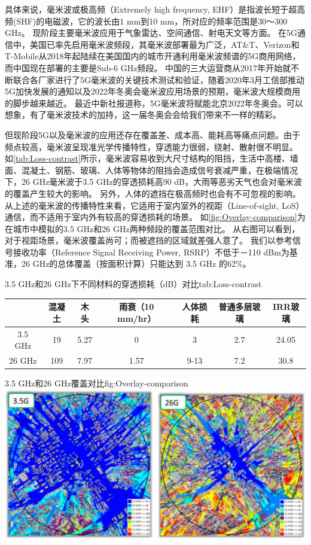 \documentclass[supercite]{HustGraduPaper}
\begin{document}
具体来说，毫米波或极高频（Extremely high frequency, EHF）是指波长短于超高频(SHF)的电磁波，它的波长由1 mm到10 mm，所对应的频率范围是30～300 GHz\cite{enwiki:1021979549}。
现阶段主要毫米波应用于气象雷达、空间通信、射电天文等方面。
在5G通信中，美国已率先启用毫米波频段，其毫米波部署最为广泛，AT\&T、Verizon和T-Mobile从2018年起陆续在美国国内的城市开通利用毫米波频谱的5G商用网络，而中国现在部署的主要是Sub-6 GHz频段\cite{ZTE2020}。
中国的三大运营商从2017年开始就不断联合各厂家进行了5G毫米波的关键技术测试和验证，随着2020年3月工信部推动5G加快发展的通知以及2022年冬奥会毫米波应用场景的预期，毫米波大规模商用的脚步越来越近\cite{ZTE2020}。
最近中新社报道称，5G毫米波将赋能北京2022年冬奥会。可以想象，有了毫米波技术的加持，这一届冬奥会会给我们带来不一样的精彩。

但现阶段5G以及毫米波的应用还存在覆盖差、成本高、能耗高等痛点问题。由于频点较高，毫米波呈现准光学传播特性，穿透能力很弱，绕射、散射很不明显。
如\autoref{tab:Loss-contrast}所示，毫米波容易收到大尺寸结构的阻挡，生活中高楼、墙面、混凝土、钢筋、玻璃、人体等物体的阻挡会造成信号衰减严重，在极端情况下，26 GHz毫米波于3.5 GHz的穿透损耗高90 dB，大雨等恶劣天气也会对毫米波的覆盖产生较大的影响\cite{8732419}。
另外，人体的遮挡在极高频时也会有不可忽视的影响。
从上述的毫米波的传播特性来看，它适用于室内室外的视距（Line-of-sight, LoS）通信，而不适用于室内外有较高的穿透损耗的场景。
如\autoref{fig:Overlay-comparison}为在城市中模拟的3.5 GHz和26 GHz两种频段的覆盖范围对比。
从右图可以看到，对于视距场景，毫米波覆盖尚可；而被遮挡的区域就差强人意了。
我们以参考信号接收功率（Reference Signal Receiving Power, RSRP）不低于－110 dBm为基准，26 GHz的总体覆盖（按面积计算）只能达到 3.5 GHz 的62\%\cite{ZTE2020}。

\begin{generaltab}{3.5 GHz和26 GHz下不同材料的穿透损耗（dB）对比\cite{ZTE2020}}{tab:Loss-contrast}
	\begin{tabular}{ccccccc}
		\toprule
		        & 混凝土 &  木头  & 雨衰（10 mm/hr） & 人体损耗 & 普通多层玻璃 & IRR玻璃 \\ \midrule
		3.5 GHz & 19  & 5.27 &      0       &  3   &  2.7   & 24.05 \\
		26 GHz  & 109 & 7.97 &     1.57     & 9-13 &  7.2   & 30.8  \\ \bottomrule
	\end{tabular}
\end{generaltab}

\begin{generalfig}[htb]{3.5 GHz和26 GHz覆盖对比\cite{ZTE2020}}{fig:Overlay-comparison}
	\includegraphics[width=0.8\linewidth]{Figures/Overlay-comparison.JPG}
\end{generalfig}
\end{document}
